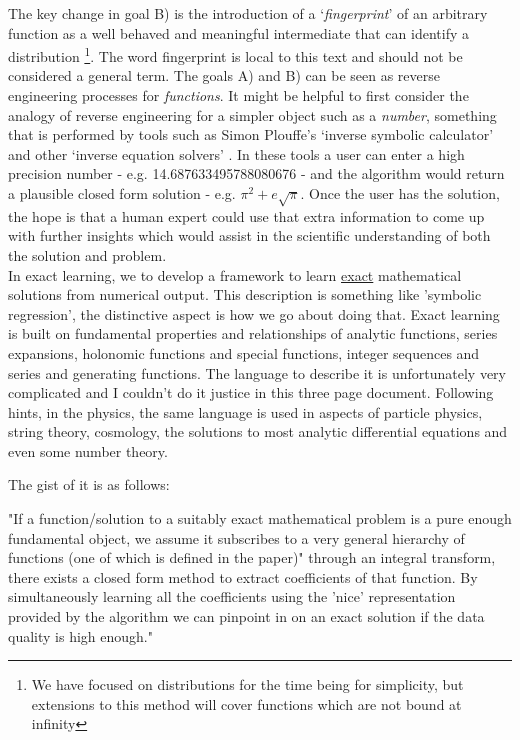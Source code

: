 \documentclass{article}
\begin{document}
The key change in goal B) is the introduction of a `\emph{fingerprint}' of an arbitrary function as a well behaved and meaningful intermediate that can identify a distribution \footnote{We have focused on distributions for the time being for simplicity, but extensions to this method will cover functions which are not bound at infinity}. The word fingerprint is local to this text and should not be considered a general term. The goals A) and B) can be seen as reverse engineering processes for \emph{functions}. It might be helpful to first consider the analogy of reverse engineering for a simpler object such as a \emph{number}, something that is performed by tools such as Simon Plouffe's `inverse symbolic calculator' \cite{Plouffe1986} and other `inverse equation solvers' \cite{Munafo}. In these tools a user can enter a high precision number - e.g. 14.687633495788080676 - and the algorithm would return a plausible closed form solution - e.g. $\pi^2 + e\sqrt{\pi}$. Once the user has the solution, the hope is that a human expert could use that extra information to come up with further insights which would assist in the scientific understanding of both the solution and problem.\\ 

In exact learning, we to develop a framework to learn \underline{exact} mathematical solutions from numerical output. This description is something like 'symbolic regression', the distinctive aspect is how we go about doing that. Exact learning is built on fundamental properties and relationships of analytic functions, series expansions, holonomic functions and special functions, integer sequences and series and generating functions. The language to describe it is unfortunately very complicated and I couldn't do it justice in this three page document. Following hints, in the physics, the same language is used in aspects of particle physics, string theory, cosmology, the solutions to most analytic differential equations and even some number theory. 

The gist of it is as follows: 

"If a function/solution to a suitably exact mathematical problem is a pure enough fundamental object, we assume it subscribes to a very general hierarchy of functions (one of which is defined in the paper)" through an integral transform, there exists a closed form method to extract coefficients of that function. By simultaneously learning all the coefficients using the 'nice' representation provided by the algorithm we can pinpoint in on an exact solution if the data quality is high enough."
\end{document}
